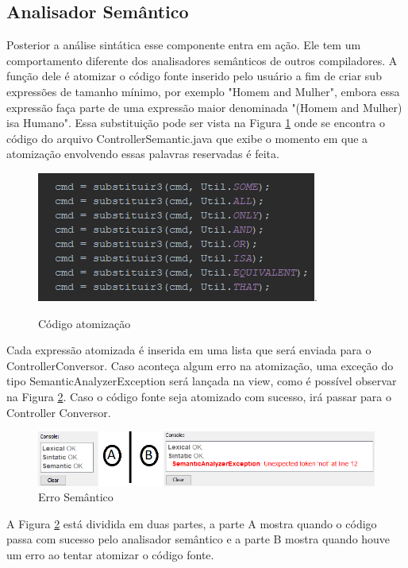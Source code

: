 \documentclass{bcc}
\begin{document}
\subsection{Analisador Semântico}

Posterior a análise sintática esse componente entra em ação. Ele tem um comportamento diferente dos analisadores semânticos de outros compiladores. A função dele é atomizar o código fonte inserido pelo usuário a fim de criar sub expressões de tamanho mínimo, por exemplo "Homem and Mulher", embora essa expressão faça parte de uma expressão maior denominada "(Homem and Mulher) isa Humano". Essa substituição pode ser vista na Figura \ref{fig:codigoAtomizacao} onde se encontra o código do arquivo ControllerSemantic.java que exibe o momento em que a atomização envolvendo essas palavras reservadas é feita. 

\begin{figure}[H]
\centering
\includegraphics[width=.7\textwidth]{Figuras/codigo_atomizacao.png}.
\caption{Código atomização}
\label{fig:codigoAtomizacao}
\end{figure}

Cada expressão atomizada é inserida em uma lista que será enviada para o ControllerConversor. Caso aconteça algum erro na atomização, uma exceção do tipo SemanticAnalyzerException será lançada na view, como é possível observar na Figura \ref{fig:codigoErroSemantico}. Caso o código fonte seja atomizado com sucesso, irá passar para o Controller Conversor.

\begin{figure}[H]
\centering
\includegraphics[width=.7\textwidth]{Figuras/codigo_erro_semantico.png}
\caption{Erro Semântico}
\label{fig:codigoErroSemantico}
\end{figure}

A Figura \ref{fig:codigoErroSemantico} está dividida em duas partes, a parte A mostra quando o código passa com sucesso pelo analisador semântico e a parte B mostra quando houve um erro ao tentar atomizar o código fonte.
\end{document}
